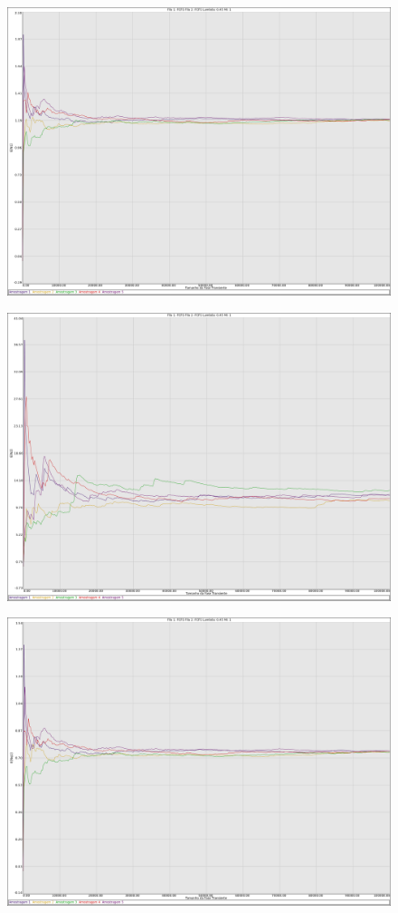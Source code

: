\documentclass[a4paper,10pt]{article}
\begin{document}
\begin{figure}
\includegraphics[scale = 0.2]{./graficos_transiente_1/FCFS/01.png}
\end{figure}
\begin{figure}
\includegraphics[scale = 0.2]{./graficos_transiente_1/FCFS/02.png}
\end{figure}
\begin{figure}
\includegraphics[scale = 0.2]{./graficos_transiente_1/FCFS/03.png}
\end{figure}
\end{document}
